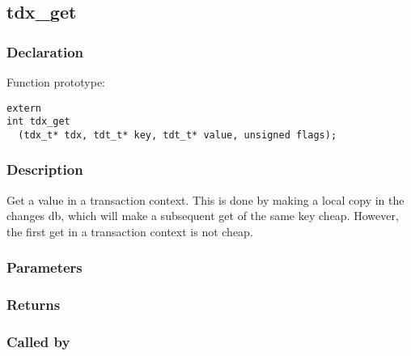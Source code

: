 
\newpage
\subsection{tdx\_get}
\subsubsection{Declaration} Function prototype:

\begin{verbatim}
extern
int tdx_get
  (tdx_t* tdx, tdt_t* key, tdt_t* value, unsigned flags);
\end{verbatim}

\subsubsection{Description}


 Get a value in a transaction context.
 This is done by making a local copy in the changes db, which will
 make a subsequent get of the same key cheap. However, the first
 get in a transaction context is not cheap.
 

\subsubsection{Parameters}
\subsubsection{Returns}
\subsubsection{Called by}

